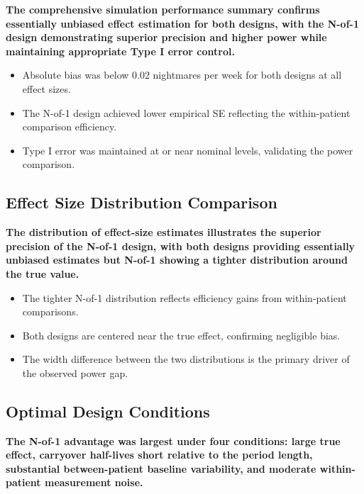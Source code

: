 \documentclass[
  11pt,
]{article}
\begin{document}
\textbf{The comprehensive simulation performance summary confirms essentially unbiased effect estimation for both designs, with the N-of-1 design demonstrating superior precision and higher power while maintaining appropriate Type I error control.}

\begin{itemize}\setlength{\itemsep}{2pt}\setlength{\parskip}{0pt}
\item Absolute bias was below 0.02 nightmares per week for both designs at all effect sizes.
\item The N-of-1 design achieved lower empirical SE reflecting the within-patient comparison efficiency.
\item Type I error was maintained at or near nominal levels, validating the power comparison.
\end{itemize}

\subsection{Effect Size Distribution Comparison}\label{effect-size-distribution-comparison}

\textbf{The distribution of effect-size estimates illustrates the superior precision of the N-of-1 design, with both designs providing essentially unbiased estimates but N-of-1 showing a tighter distribution around the true value.}

\begin{itemize}\setlength{\itemsep}{2pt}\setlength{\parskip}{0pt}
\item The tighter N-of-1 distribution reflects efficiency gains from within-patient comparisons.
\item Both designs are centered near the true effect, confirming negligible bias.
\item The width difference between the two distributions is the primary driver of the observed power gap.
\end{itemize}

\subsection{Optimal Design Conditions}\label{optimal-design-conditions}

\textbf{The N-of-1 advantage was largest under four conditions: large true effect, carryover half-lives short relative to the period length, substantial between-patient baseline variability, and moderate within-patient measurement noise.}
\end{document}

